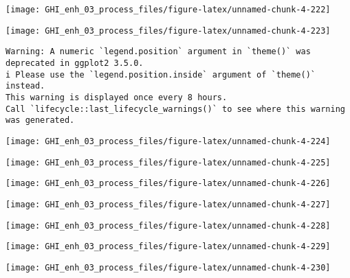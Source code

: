 \documentclass[
  10pt,
  a4paper,oneside]{article}
\begin{document}
\begin{center}\texttt{[image: GHI\_enh\_03\_process\_files/figure-latex/unnamed-chunk-4-222]} \end{center}

\begin{center}\texttt{[image: GHI\_enh\_03\_process\_files/figure-latex/unnamed-chunk-4-223]} \end{center}

\begin{verbatim}
Warning: A numeric `legend.position` argument in `theme()` was deprecated in ggplot2 3.5.0.
i Please use the `legend.position.inside` argument of `theme()` instead.
This warning is displayed once every 8 hours.
Call `lifecycle::last_lifecycle_warnings()` to see where this warning was generated.
\end{verbatim}

\begin{center}\texttt{[image: GHI\_enh\_03\_process\_files/figure-latex/unnamed-chunk-4-224]} \end{center}

\begin{center}\texttt{[image: GHI\_enh\_03\_process\_files/figure-latex/unnamed-chunk-4-225]} \end{center}

\begin{center}\texttt{[image: GHI\_enh\_03\_process\_files/figure-latex/unnamed-chunk-4-226]} \end{center}

\begin{center}\texttt{[image: GHI\_enh\_03\_process\_files/figure-latex/unnamed-chunk-4-227]} \end{center}

\begin{center}\texttt{[image: GHI\_enh\_03\_process\_files/figure-latex/unnamed-chunk-4-228]} \end{center}

\begin{center}\texttt{[image: GHI\_enh\_03\_process\_files/figure-latex/unnamed-chunk-4-229]} \end{center}

\begin{center}\texttt{[image: GHI\_enh\_03\_process\_files/figure-latex/unnamed-chunk-4-230]} \end{center}
\end{document}
